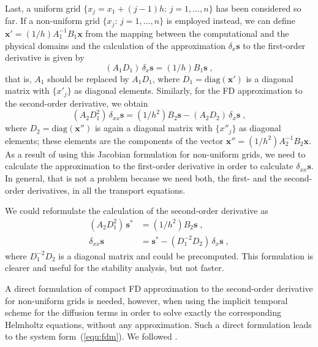 Last, a uniform grid $\{x_j=x_1+(j-1)h:\, j = 1,\ldots,n\}$ has been considered so far. If a non-uniform grid $\{x_j:\, j = 1,\ldots,n\}$ is employed instead, we can define $\mathbf{x'} = (1/h)A_1^{-1}B_1\mathbf{x}$ from the mapping between the computational and the physical domains and the calculation of the approximation $\delta_{x} \mathbf{s}$ to the first-order derivative is given by
\begin{equation}\label{equ:nonuniform1}
  (A_1D_1)\, \delta_x \mathbf{s}=(1/h)B_1 \mathbf{s} \;,
\end{equation}
that is, $A_1$ should be replaced by $A_1D_1$, where $D_1=\text{diag} (\mathbf{x'})$ is a diagonal matrix with $\{x'_j\}$ as diagonal elements. Similarly, for the FD approximation to the second-order derivative, we obtain
\begin{equation}
  (A_2D_1^2)\, \delta_{xx} \mathbf{s}=(1/h^2)B_2 \mathbf{s} - (A_2D_2)\,\delta_x
  \mathbf{s} \;,
\end{equation}
where $D_2=\text{diag} (\mathbf{x''})$ is again a diagonal matrix with
$\{x''_j\}$ as diagonal elements; these elements are the components of the vector $\mathbf{x''} = (1/h^2)A_2^{-1}B_2\mathbf{x}$. As a result of using this Jacobian formulation for non-uniform grids, we need to calculate the approximation to the first-order derivative in order to calculate $\delta_{xx} \mathbf{s}$. In general, that is not a problem because we need both, the first- and the second-order derivatives, in all the transport equations.

We could reformulate the calculation of the second-order derivative as
\begin{subequations}\label{equ:nonuniform2}
  \begin{align}
    (A_2D_1^2)\, \mathbf{s}^*&=(1/h^2)B_2 \mathbf{s} \;,\\
    \delta_{xx} \mathbf{s}&= \mathbf{s}^*- (D_1^{-2}D_2)\,\delta_x  \mathbf{s} \;,
  \end{align}
\end{subequations}
where $D_1^{-2}D_2$ is a diagonal matrix and could be precomputed. This formulation is clearer and useful for the stability analysis, but not faster.

A direct formulation of compact FD approximation to the second-order derivative for non-uniform grids is needed, however, when using the implicit temporal scheme for the diffusion terms in order to solve exactly the corresponding Helmholtz equations, without any approximation. Such a direct formulation leads to the system form~(\ref{equ:fdm}). We followed \cite{Shukla:2005}.

